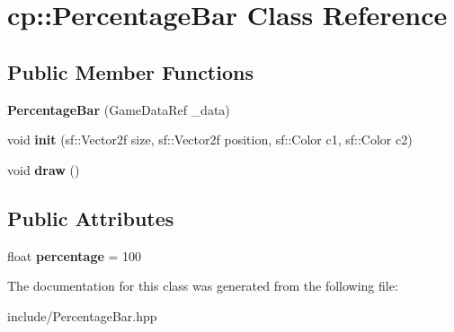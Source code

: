 \hypertarget{classcp_1_1_percentage_bar}{}\section{cp\+:\+:Percentage\+Bar Class Reference}
\label{classcp_1_1_percentage_bar}
\subsection*{Public Member Functions}
\begin{DoxyCompactItemize}
\item 
\mbox{\label{classcp_1_1_percentage_bar_ab8a2cf28733f06ac05e97b493da3f2f0}} 
{\bfseries Percentage\+Bar} (Game\+Data\+Ref \+\_\+data)
\item 
\mbox{\label{classcp_1_1_percentage_bar_aefcfb21afb5f633a5eb4fca2d5405c63}} 
void {\bfseries init} (sf\+::\+Vector2f size, sf\+::\+Vector2f position, sf\+::\+Color c1, sf\+::\+Color c2)
\item 
\mbox{\label{classcp_1_1_percentage_bar_a15004a48ed290ce7dc017425b554ba33}} 
void {\bfseries draw} ()
\end{DoxyCompactItemize}
\subsection*{Public Attributes}
\begin{DoxyCompactItemize}
\item 
\mbox{\label{classcp_1_1_percentage_bar_a1bd6bed09b32268be4fb0a3e93366447}} 
float {\bfseries percentage} = 100
\end{DoxyCompactItemize}


The documentation for this class was generated from the following file\+:\begin{DoxyCompactItemize}
\item 
include/Percentage\+Bar.\+hpp\end{DoxyCompactItemize}
